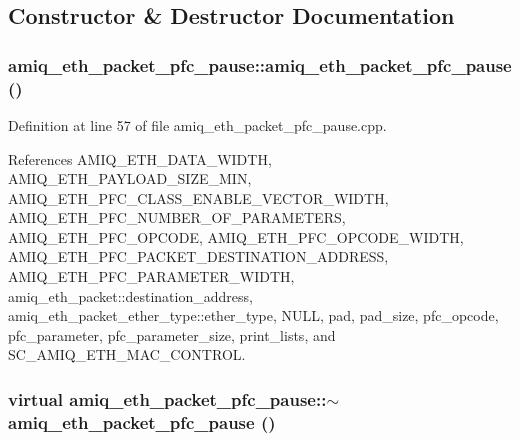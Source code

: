 \subsection{Constructor \& Destructor Documentation}
\hypertarget{classamiq__eth__packet__pfc__pause_a28632a96a7692e0c6671be8e6f274b38}{
\subsubsection[{amiq\_\-eth\_\-packet\_\-pfc\_\-pause}]{\setlength{\rightskip}{0pt plus 5cm}amiq\_\-eth\_\-packet\_\-pfc\_\-pause::amiq\_\-eth\_\-packet\_\-pfc\_\-pause ()}}
\label{classamiq__eth__packet__pfc__pause_a28632a96a7692e0c6671be8e6f274b38}


Definition at line 57 of file amiq\_\-eth\_\-packet\_\-pfc\_\-pause.cpp.

References AMIQ\_\-ETH\_\-DATA\_\-WIDTH, AMIQ\_\-ETH\_\-PAYLOAD\_\-SIZE\_\-MIN, AMIQ\_\-ETH\_\-PFC\_\-CLASS\_\-ENABLE\_\-VECTOR\_\-WIDTH, AMIQ\_\-ETH\_\-PFC\_\-NUMBER\_\-OF\_\-PARAMETERS, AMIQ\_\-ETH\_\-PFC\_\-OPCODE, AMIQ\_\-ETH\_\-PFC\_\-OPCODE\_\-WIDTH, AMIQ\_\-ETH\_\-PFC\_\-PACKET\_\-DESTINATION\_\-ADDRESS, AMIQ\_\-ETH\_\-PFC\_\-PARAMETER\_\-WIDTH, amiq\_\-eth\_\-packet::destination\_\-address, amiq\_\-eth\_\-packet\_\-ether\_\-type::ether\_\-type, NULL, pad, pad\_\-size, pfc\_\-opcode, pfc\_\-parameter, pfc\_\-parameter\_\-size, print\_\-lists, and SC\_\-AMIQ\_\-ETH\_\-MAC\_\-CONTROL.\hypertarget{classamiq__eth__packet__pfc__pause_ac065ae8ab2a4be786b1aee99ebfc8aeb}{
\subsubsection[{$\sim$amiq\_\-eth\_\-packet\_\-pfc\_\-pause}]{\setlength{\rightskip}{0pt plus 5cm}virtual amiq\_\-eth\_\-packet\_\-pfc\_\-pause::$\sim$amiq\_\-eth\_\-packet\_\-pfc\_\-pause ()}}
\label{classamiq__eth__packet__pfc__pause_ac065ae8ab2a4be786b1aee99ebfc8aeb}


